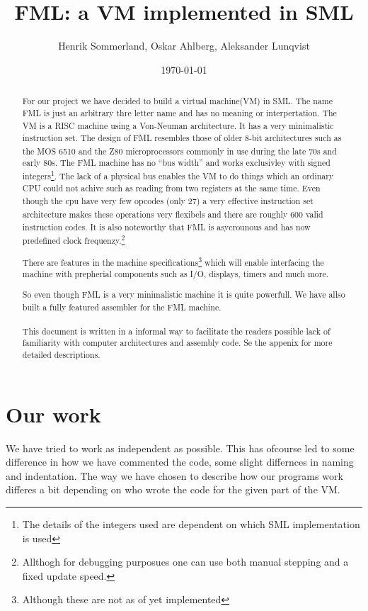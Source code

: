 \documentclass{article}
\title{FML: a VM implemented in SML}
\author{Henrik Sommerland, Oskar Ahlberg, Aleksander Lunqvist}
\date{\today}
\begin{document}
\maketitle
\begin{abstract}
For our project we have decided to build a virtual 
machine(VM)\textsuperscript{\cite{Virtual}} in SML.
The name FML is just an arbitrary thre letter name and has no meaning or interpertation.
The VM is a RISC\textsuperscript{\cite{risc}} machine using a Von-Neuman
architecture\textsuperscript{\cite{neuman}}. It has a very minimalistic
instruction set. The design of FML resembles those of older 8-bit architectures such as the MOS 6510\textsuperscript{\cite{6510}} and the
Z80\textsuperscript{\cite{z80}} microprocessors commonly in use during the late
70s and early 80s. The FML machine has no ``bus width'' and works exclusivley with signed integers\footnote{The details of the integers
used are dependent on which SML implementation is used}. The lack of a physical
bus enables the VM to do things which an ordinary CPU could not achive such as
reading from two registers at the same time. Even though
the cpu have very few opcodes\textsuperscript{\cite{opcode}} (only 27) a very
effective instruction set architecture\textsuperscript{\cite{ISA}} makes these operations very flexibels
and there are roughly 600 valid instruction codes. It is also noteworthy that
FML is asycrounous\textsuperscript{\cite{async}} and has now predefined clock
frequenzy.\footnote{Allthogh for debugging purposues one can use both manual stepping and a fixed update speed.}

There are features in the machine specifications\footnote{Although these are
not as of yet implemented} which will enable interfacing the machine with
prepherial components such as I/O, displays, timers and much more.

So even though FML is a very minimalistic machine it is quite powerfull.
We have allso built a fully featured assembler\textsuperscript{\cite{assembler}}
for the FML machine.
\\
\\
This document is written in a informal way to facilitate the readers possible
lack of familiarity with computer architectures and assembly code. Se the
appenix for more detailed descriptions.
\end{abstract}
\newpage
\tableofcontents
\newpage
\section{Our work}
We have tried to work as independent as possible. This has ofcourse led to some
difference in how we have commented the code, some slight differnces in naming
and indentation. The way we have chosen to describe how our programs work
differes a bit depending on who wrote the code for the given part of the
VM.
\end{document}
